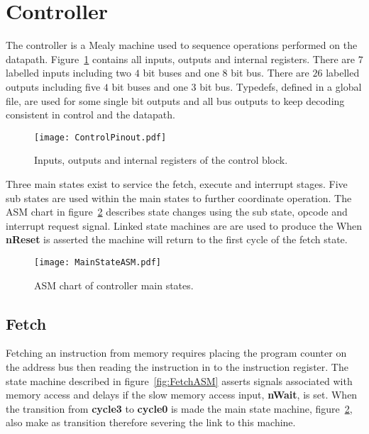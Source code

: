 \section{Controller}

The controller is a Mealy machine used to sequence operations performed on the datapath.
Figure~\ref{fig:ControlBlock} contains all inputs, outputs and internal registers.
There are $7$ labelled inputs including two $4$ bit buses and one $8$ bit bus.
There are $26$ labelled outputs including five $4$ bit buses and one $3$ bit bus.
Typedefs, defined in a global file, are used for some single bit outputs and all bus outputs to keep decoding consistent in control and the datapath. 


\begin{figure}[ht]
   \centering
    \texttt{[image: ControlPinout.pdf]}
		\caption{Inputs, outputs and internal registers of the control block.}%
   \label{fig:ControlBlock}
\end{figure}

Three main states exist to service the fetch, execute and interrupt stages.
Five sub states are used within the main states to further coordinate operation.
The ASM chart in figure~\ref{fig:MainStateASM} describes state changes using the sub state, opcode and interrupt request signal.   
Linked state machines are are used to produce the 
When \textbf{nReset} is asserted the machine will return to the first cycle of the fetch state.



\begin{figure}[ht]
   \centering
    \texttt{[image: MainStateASM.pdf]}
		\caption{ASM chart of controller main states.}
		\label{fig:MainStateASM}
\end{figure}








\subsection{Fetch}

Fetching an instruction from memory requires placing the program counter on the address bus then reading the instruction in to the instruction register. 
The state machine described in figure~\ref{fig:FetchASM} asserts signals associated with memory access and delays if the slow memory access input, \textbf{nWait}, is set.
When the transition from \textbf{cycle3} to \textbf{cycle0} is made the main state machine, figure~\ref{fig:MainStateASM}, also make as transition therefore severing the link to this machine. 

